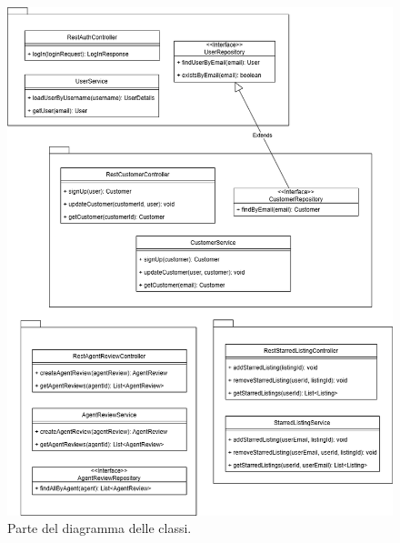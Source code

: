 \begin{figure}[h]
    \centering
    \includegraphics[width=\textwidth]{assets/diagrams/class-diagram/class-diagram-2.png}
    \caption{Parte del diagramma delle classi.}
    \label{fig:Parte 2 del diagramma delle classi}
\end{figure}

